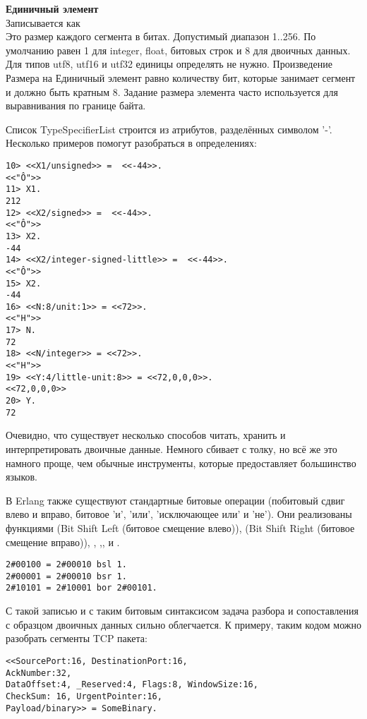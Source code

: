 \begin{minipage}{\textwidth}
    \textbf{Единичный элемент}\\ 
    Записывается как \\ 
    Это размер каждого сегмента в битах.
    Допустимый диапазон 1..256. По умолчанию равен 1 для integer, float, битовых строк и 8 для двоичных данных.
    Для типов utf8, utf16 и utf32 единицы определять не нужно.
    Произведение Размера на Единичный элемент равно количеству бит, которые занимает сегмент и должно быть кратным 8.
    Задание размера элемента часто используется для выравнивания по границе байта.\\  
\end{minipage}

Список TypeSpecifierList строится из атрибутов, разделённых символом '\--'.\\ 

Несколько примеров помогут разобраться в определениях:
\begin{lstlisting}[style=repl]
10> <<X1/unsigned>> =  <<-44>>.
<<"Ô">>
11> X1.
212
12> <<X2/signed>> =  <<-44>>. 
<<"Ô">>
13> X2.
-44
14> <<X2/integer-signed-little>> =  <<-44>>.
<<"Ô">>
15> X2.
-44
16> <<N:8/unit:1>> = <<72>>.
<<"H">>
17> N.
72
18> <<N/integer>> = <<72>>.
<<"H">>
19> <<Y:4/little-unit:8>> = <<72,0,0,0>>.     
<<72,0,0,0>>
20> Y.
72
\end{lstlisting}

Очевидно, что существует несколько способов читать, хранить и интерпретировать двоичные данные.
Немного сбивает с толку, но всё же это намного проще, чем обычные инструменты, которые предоставляет большинство языков.

В Erlang также существуют стандартные битовые операции (побитовый сдвиг влево и вправо, битовое 'и', 'или', 'исключающее или' и 'не').
Они реализованы функциями  (Bit Shift Left (битовое смещение влево)),  (Bit Shift Right (битовое смещение вправо)), , ,, и .
\begin{lstlisting}[style=repl]
2#00100 = 2#00010 bsl 1.
2#00001 = 2#00010 bsr 1.
2#10101 = 2#10001 bor 2#00101.
\end{lstlisting}

С такой записью и с таким битовым синтаксисом задача разбора и сопоставления с образцом двоичных данных сильно облегчается.
К примеру, таким кодом можно разобрать сегменты TCP пакета:
\begin{lstlisting}[style=repl]
<<SourcePort:16, DestinationPort:16,
AckNumber:32,
DataOffset:4, _Reserved:4, Flags:8, WindowSize:16,
CheckSum: 16, UrgentPointer:16,
Payload/binary>> = SomeBinary.
\end{lstlisting}

